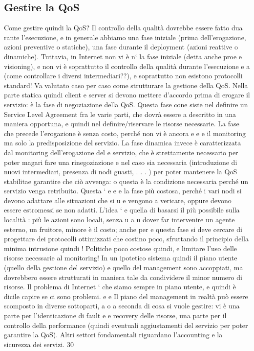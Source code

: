\documentclass[a4paper,12pt]{article}
\begin{document}
\subsection{Gestire la QoS}
Come gestire quindi la QoS? Il controllo della qualità dovrebbe essere fatto dua
rante l'esecuzione, e in generale abbiamo una fase iniziale (prima dell'erogazione,
azioni preventive o statiche), una fase durante il deployment (azioni reattive o
dinamiche). Tuttavia, in Internet non vi è n` la fase iniziale (detta anche proe e
visioning), e non vi è soprattutto il controllo della qualità durante l'esecuzione
e
a
(come controllare i diversi intermediari??), e soprattutto non esistono protocolli
standard! Va valutato caso per caso come strutturare la gestione della QoS.
Nella parte statica quindi client e server si devono mettere d'accordo prima
di erogare il servizio: è la fase di negoziazione della QoS. Questa fase cone
siste nel definire un Service Level Agreement fra le varie parti, che dovrà essere
a
descritto in una maniera opportuna, e quindi nel definire/riservare le risorse necessarie. La fase che precede
l'erogazione è senza costo, perché non vi è ancora
e
e
e
il monitoring ma solo la predisposizione del servizio.
La fase dinamica invece è caratterizzata dal monitoring dell'erogazione del
e
servizio, che è strettamente necessario per poter magari fare una rinegoziazione
e
nel caso sia necessaria (introduzione di nuovi intermediari, presenza di nodi
guasti, . . . ) per poter mantenere la QoS stabilitae garantire che ciò avvenga:
o
questa è la condizione necessaria perché un servizio venga retribuito. Questa `
e
e
e
la fase più costosa, perché i vari nodi si devono adattare alle situazioni che si
u
e
vengono a vericare, oppure devono essere estromessi se non adatti. L'idea `
e
quella di basarsi il più possibile sulla località : più le azioni sono locali, senza
u
a
u
dover far intervenire un agente esterno, un fruitore, minore è il costo; anche per
e
questa fase si deve cercare di progettare dei protocolli ottimizzati che costino
poco, sfruttando il principio della minima intrusione quindi ! Politiche poco
costose quindi, e limitare l'uso delle risorse necessarie al monitoring! In un
ipotetico sistema quindi il piano utente (quello della gestione del servizio) e
quello del management sono accoppiati, ma dovrebbero essere strutturati in
maniera tale da condividere il minor numero di risorse. Il problema di Internet
` che siamo sempre in piano utente, e quindi è dicile capire se ci sono problemi.
e
e
Il piano del management in realtà può essere scomposto in diverse sottoparti,
a o
a seconda di cosa si vuole gestire: vi è una parte per l'identicazione di fault
e
e recovery delle risorse, una parte per il controllo della performance (quindi
eventuali aggiustamenti del servizio per poter garantire la QoS). Altri settori
fondamentali riguardano l'accounting e la sicurezza dei servizi.
30
\end{document}
